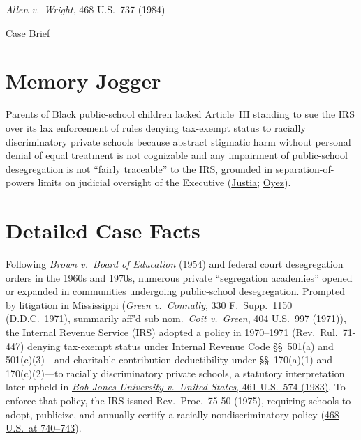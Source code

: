 \documentclass[12pt]{article}
\begin{document}
\begin{center}
{\LARGE \textit{Allen v.\ Wright}, 468 U.S.\ 737 (1984)\par}
\vspace{0.8em}
{\large Case Brief\par}
\end{center}
\vspace{1em}

\section{Memory Jogger}
Parents of Black public-school children lacked Article~III standing to sue the IRS over its lax enforcement of rules denying tax-exempt status to racially discriminatory private schools because abstract stigmatic harm without personal denial of equal treatment is not cognizable and any impairment of public-school desegregation is not ``fairly traceable'' to the IRS, grounded in separation-of-powers limits on judicial oversight of the Executive (\href{https://supreme.justia.com/cases/federal/us/468/737/}{Justia}; \href{https://www.oyez.org/cases/1983/81-757}{Oyez}).

\section{Detailed Case Facts}
Following \textit{Brown v.\ Board of Education} (1954) and federal court desegregation orders in the 1960s and 1970s, numerous private ``segregation academies'' opened or expanded in communities undergoing public-school desegregation. Prompted by litigation in Mississippi (\textit{Green v.\ Connally}, 330 F.\ Supp.\ 1150 (D.D.C.\ 1971), summarily aff'd sub nom.\ \textit{Coit v.\ Green}, 404 U.S.\ 997 (1971)), the Internal Revenue Service (IRS) adopted a policy in 1970--1971 (Rev.\ Rul.\ 71-447) denying tax-exempt status under Internal Revenue Code \S\S~501(a) and 501(c)(3)---and charitable contribution deductibility under \S\S~170(a)(1) and 170(c)(2)---to racially discriminatory private schools, a statutory interpretation later upheld in \href{https://supreme.justia.com/cases/federal/us/461/574/}{\textit{Bob Jones University v.\ United States}, 461 U.S.\ 574 (1983)}. To enforce that policy, the IRS issued Rev.\ Proc.\ 75-50 (1975), requiring schools to adopt, publicize, and annually certify a racially nondiscriminatory policy (\href{https://supreme.justia.com/cases/federal/us/468/737/}{468 U.S.\ at 740--743}).
\end{document}
